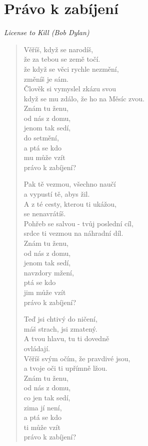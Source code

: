 \section*{Právo k zabíjení}

\textit{License to Kill (Bob Dylan)}

\begin{verse}
 Věříš, když se narodíš,\\ 
 že za tebou se země točí.\\
 že když se věci rychle nezmění, \\
 změníš je sám.\\
 Člověk si vymyslel zkázu svou\\
 když se mu zdálo, že ho na Měsíc zvou.\\
 Znám tu ženu,\\
 od nás z domu,\\
 jenom tak sedí,\\
 do setmění,\\
 a ptá se kdo \\
 mu může vzít \\
 právo k zabíjení?
 
 Pak tě vezmou, všechno naučí \\
 a vypustí tě, abys žil. \\
 A z té cesty, kterou ti ukážou,  \\
 se nenavrátíš. \\
 Pohřeb se salvou - tvůj poslední cíl, \\
 srdce ti vezmou na náhradní díl. \\
 Znám tu ženu, \\
 od nás z domu, \\
 jenom tak sedí, \\
 navzdory mžení, \\
 ptá se kdo \\
 jim může vzít \\
 právo k zabíjení?
 
 Teď jsi chtivý do ničení, \\
 máš strach, jsi zmatený. \\
 A tvou hlavu, tu ti dovedně \\
 ovládají. \\
 Věříš svým očím, že pravdivé jsou, \\
 a tvoje oči ti upřímně lžou. \\
 Znám tu ženu, \\
 od nás z domu, \\
 co jen tak sedí, \\
 zima jí není, \\
 a ptá se kdo \\
 ti může vzít \\
 právo k zabíjení?
 

\end{verse}
